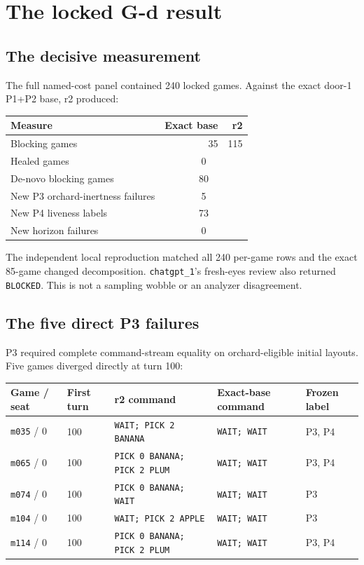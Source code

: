 \documentclass[10pt,a4paper]{article}
\newcommand{\code}[1]{\texttt{#1}}
\begin{document}
\section{The locked G-d result}

\subsection{The decisive measurement}

The full named-cost panel contained 240 locked games. Against the exact door-1 P1+P2 base, r2
produced:

\begin{center}
\begin{tabular}{@{}lrr@{}}
\toprule
\textbf{Measure} & \textbf{Exact base} & \textbf{r2} \\
\midrule
Blocking games & 35 & 115 \\
Healed games & \multicolumn{2}{c}{0} \\
De-novo blocking games & \multicolumn{2}{c}{80} \\
New P3 orchard-inertness failures & \multicolumn{2}{c}{5} \\
New P4 liveness labels & \multicolumn{2}{c}{73} \\
New horizon failures & \multicolumn{2}{c}{0} \\
\bottomrule
\end{tabular}
\end{center}

The independent local reproduction matched all 240 per-game rows and the exact 85-game changed
decomposition. \code{chatgpt\_1}'s fresh-eyes review also returned \code{BLOCKED}. This is not a
sampling wobble or an analyzer disagreement.

\subsection{The five direct P3 failures}

P3 required complete command-stream equality on orchard-eligible initial layouts. Five games
diverged directly at turn 100:

\begin{tabularx}{\textwidth}{@{}p{23mm}C{18mm}Y Y p{17mm}@{}}
\toprule
\textbf{Game / seat} & \textbf{First turn} & \textbf{r2 command} & \textbf{Exact-base command} & \textbf{Frozen label} \\
\midrule
\code{m035} / 0 & 100 & \code{WAIT; PICK 2 BANANA} & \code{WAIT; WAIT} & P3, P4 \\
\code{m065} / 0 & 100 & \code{PICK 0 BANANA; PICK 2 PLUM} & \code{WAIT; WAIT} & P3, P4 \\
\code{m074} / 0 & 100 & \code{PICK 0 BANANA; WAIT} & \code{WAIT; WAIT} & P3 \\
\code{m104} / 0 & 100 & \code{WAIT; PICK 2 APPLE} & \code{WAIT; WAIT} & P3 \\
\code{m114} / 0 & 100 & \code{PICK 0 BANANA; PICK 2 PLUM} & \code{WAIT; WAIT} & P3, P4 \\
\bottomrule
\end{tabularx}
\end{document}

